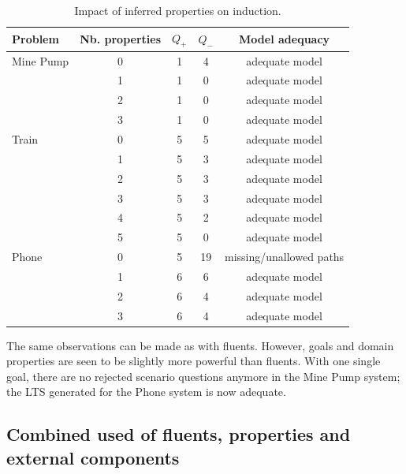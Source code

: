 \begin{table}[H]
\centering
\begin{tabular}{|l||c||c|c|c|}\hline
Problem   & Nb. properties &$Q_+$&$Q_-$& Model adequacy\\\hline\hline
Mine Pump & 0              & 1   & 4   & adequate model\\\cline{2-5}
          & 1              & 1   & 0   & adequate model\\\cline{2-5}
          & 2              & 1   & 0   & adequate model\\\cline{2-5}
          & 3              & 1   & 0   & adequate model\\\hline\hline
Train     & 0              & 5   & 5   & adequate model\\\cline{2-5}
          & 1              & 5   & 3   & adequate model\\\cline{2-5}
          & 2              & 5   & 3   & adequate model\\\cline{2-5}
          & 3              & 5   & 3   & adequate model\\\cline{2-5}
          & 4              & 5   & 2   & adequate model\\\cline{2-5}
          & 5              & 5   & 0   & adequate model\\\hline\hline
Phone     & 0              & 5   & 19  & missing/unallowed paths\\\cline{2-5}
          & 1              & 6   & 6   & adequate model\\\cline{2-5}
          & 2              & 6   & 4   & adequate model\\\cline{2-5}
          & 3              & 6   & 4   & adequate model\\\hline
\end{tabular}
\caption{Impact of inferred properties on induction.\label{Properties:res}}
\end{table}

The same observations can be made as with fluents. However, goals and domain properties are seen to be slightly more powerful than fluents. With one single goal, there are no rejected scenario questions anymore in the Mine Pump system; the LTS generated for the Phone system is now adequate.


\subsection{Combined used of fluents, properties and external components}

